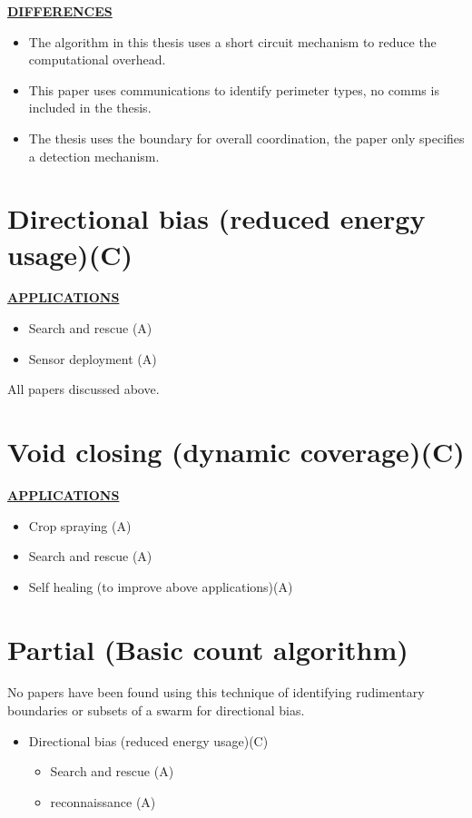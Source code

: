 \documentclass[a4paper,11pt,nocenter,bold,notitlepage,noheadline,noindent]{
thesis}
\begin{document}
\textbf{\underline{DIFFERENCES}}
\begin{itemize}
   \setlength\itemsep{0em}
	\item The algorithm in this thesis uses a short circuit mechanism to reduce the computational overhead.
	\item This paper uses communications to identify perimeter types, no comms is included in the thesis.
	\item The thesis uses the boundary for overall coordination, the paper only specifies a detection mechanism.
\end{itemize} 

\section{Directional bias (reduced energy usage)(C) \cite{SOM:12,ZAPS:07,ZFG:13,AKK:08,APZDAMC:09,AZDPS:11,JG:13,RMT:15,SALGVPJ:08}}
\textbf{\underline{APPLICATIONS}} 
\begin{itemize}
  \setlength\itemsep{0em}
	\item Search and rescue (A) \cite{SALGVPJ:08}
	\item Sensor deployment (A) \cite{ZAPS:07}
\end{itemize}

All papers discussed above.

\section{Void closing (dynamic coverage)(C)\cite{HGCTREA:15,RMT:15}}   
\textbf{\underline{APPLICATIONS}}
\begin{itemize}
  \setlength\itemsep{0em}
  	\item Crop spraying (A) \cite{HGCTREA:15}
   \item Search and rescue (A)
 	\item Self healing (to improve above applications)(A) \cite{RMT:15}
\end{itemize}	

\section{Partial (Basic count algorithm)}
No papers have been found using this technique of identifying rudimentary boundaries or subsets of a swarm for directional bias.

\begin{itemize}
\setlength\itemsep{0em}
	\item Directional bias (reduced energy usage)(C)
	\begin{itemize}
   \setlength\itemsep{0em}
   	\item Search and rescue (A)
   	\item reconnaissance (A)
	\end{itemize}
\end{itemize}
	
\end{document}
